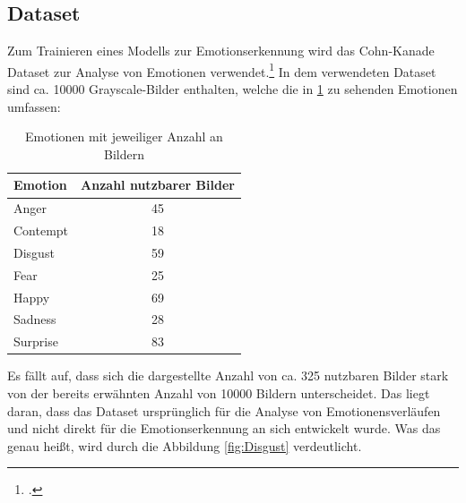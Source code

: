 \documentclass[12pt, a4paper]{report}
\begin{document}
\subsection{Dataset}
Zum Trainieren eines Modells zur Emotionserkennung wird das Cohn-Kanade Dataset zur Analyse von Emotionen verwendet.\footcite[Vgl.][]{CK} In dem verwendeten Dataset sind ca. 10000 Grayscale-Bilder enthalten, welche die in \ref{tab:ckemotions} zu sehenden Emotionen umfassen:
\begin{table}[h]
\centering
\begin{tabular}[t]{l|c}
Emotion & Anzahl nutzbarer Bilder \\
\hline
Anger & 45 \\
Contempt & 18 \\
Disgust & 59 \\
Fear & 25 \\
Happy & 69 \\
Sadness & 28 \\
Surprise & 83 \\
\hline
\end{tabular}
\caption{Emotionen mit jeweiliger Anzahl an Bildern}
\label{tab:ckemotions}
\end{table}
Es fällt auf, dass sich die dargestellte Anzahl von ca. 325 nutzbaren Bilder stark von der bereits erwähnten Anzahl von 10000 Bildern unterscheidet. Das liegt daran, dass das Dataset ursprünglich für die Analyse von Emotionensverläufen und nicht direkt für die Emotionserkennung an sich entwickelt wurde. Was das genau heißt, wird durch die Abbildung \ref{fig:Disgust} verdeutlicht.
\end{document}
